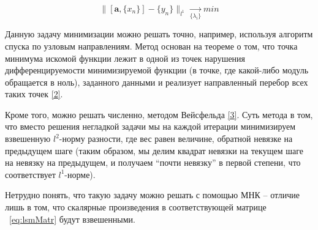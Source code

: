 \begin{equation}\label{eq:lmm}
	\|[\boldsymbol{a}, \{x_n\}] - \{y_n\} \|_{l^1} \underset{\{\lambda_i\}}{\longrightarrow} min
\end{equation}

Данную задачу минимизации можно решать точно, например, используя алгоритм спуска по узловым направлениям. Метод основан на теореме о том, что точка минимума искомой функции лежит в одной из точек нарушения дифференцируемости минимизируемой функции (в точке, где какой-либо модуль обращается в ноль), заданного данными и реализует направленный перебор всех таких точек \hyperref[tyrsin]{[2]}.

Кроме того, можно решать численно, методом Вейсфельда \hyperref[weysfeld]{[3]}. Суть метода в том, что вместо решения негладкой задачи мы на каждой итерации минимизируем взвешенную $l^2$-норму разности, где вес равен величине, обратной невязке на предыдущем шаге (таким образом, мы делим квадрат невязки на текущем шаге на невязку на предыдущем, и получаем ``почти невязку'' в первой степени, что соответствует $l^1$-норме).

Нетрудно понять, что такую задачу можно решать с помощью МНК -- отличие лишь в том, что скалярные произведения в соответствующей матрице ~\eqref{eq:lsmMatr} будут взвешенными.